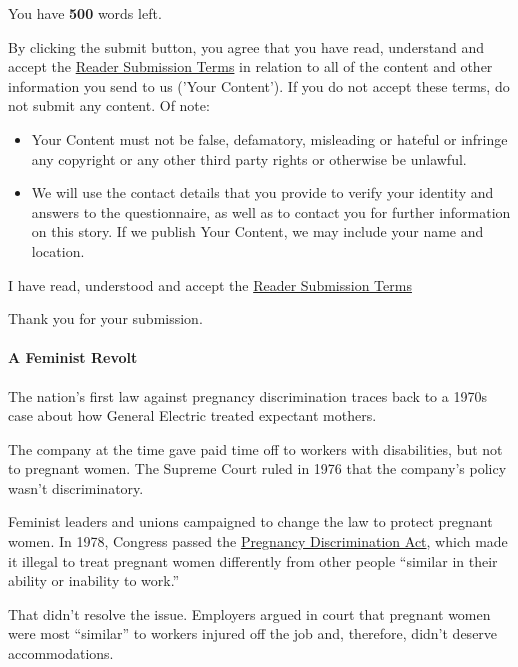 You have \textbf{500} words left.

By clicking the submit button, you agree that you have read, understand
and accept the
\href{https://help.nytimes3xbfgragh.onion/hc/en-us/articles/360004901454-Reader-submission-terms}{Reader
Submission Terms} in relation to all of the content and other
information you send to us ('Your Content'). If you do not accept these
terms, do not submit any content. Of note:

\begin{itemize}
\tightlist
\item
  Your Content must not be false, defamatory, misleading or hateful or
  infringe any copyright or any other third party rights or otherwise be
  unlawful.
\item
  We will use the contact details that you provide to verify your
  identity and answers to the questionnaire, as well as to contact you
  for further information on this story. If we publish Your Content, we
  may include your name and location.
\end{itemize}

I have read, understood and accept the
\href{https://help.nytimes3xbfgragh.onion/hc/en-us/articles/360004901454-Reader-submission-terms}{Reader
Submission Terms}

Thank you for your submission.

\hypertarget{a-feminist-revolt}{%
\paragraph{A Feminist Revolt}\label{a-feminist-revolt}}

The nation's first law against pregnancy discrimination traces back to a
1970s case about how General Electric treated expectant mothers.

The company at the time gave paid time off to workers with disabilities,
but not to pregnant women. The Supreme Court ruled in 1976 that the
company's policy wasn't discriminatory.

Feminist leaders and unions campaigned to change the law to protect
pregnant women. In 1978, Congress passed the
\href{https://www.gpo.gov/fdsys/pkg/STATUTE-92/pdf/STATUTE-92-Pg2076.pdf}{Pregnancy
Discrimination Act}, which made it illegal to treat pregnant women
differently from other people ``similar in their ability or inability to
work.''

That didn't resolve the issue. Employers argued in court that pregnant
women were most ``similar'' to workers injured off the job and,
therefore, didn't deserve accommodations.

